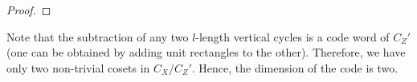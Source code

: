 \documentclass[12pt,a4paper]{article}
\begin{document}
\begin{proof}
%
% 
\end{proof}
Note that the subtraction of any two $l$-length vertical cycles is a code word of $C_Z'$ (one can be obtained by adding unit rectangles to the other). Therefore, we have only two non-trivial cosets in $C_X/C_Z'$. Hence, the dimension of the code is two. 

%
%    

%
%

%
 





\printbibliography 
\end{document}
